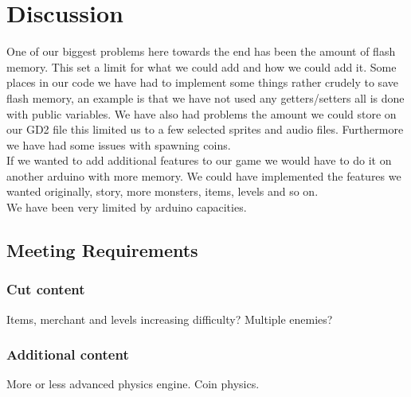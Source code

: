 \chapter{Discussion}
 
One of our biggest problems here towards the end has been the amount of flash memory. This set a limit for what we could add and how we could add it. Some places in our code we have had to implement some things rather crudely to save flash memory, an example is that we have not used any getters/setters all is done with public variables. We have also had problems the amount we could store on our GD2 file this limited us to a few selected sprites and audio files. Furthermore we have had some issues with spawning coins.\\
If we wanted to add additional features to our game we would have to do it on another arduino with more memory. We could have implemented the features we wanted originally, story, more monsters, items, levels and so on.\\
We have been very limited by arduino capacities. 


\section{Meeting Requirements}

\subsection*{Cut content}
Items, merchant and levels
increasing difficulty?
Multiple enemies?
\subsection*{Additional content}
More or less advanced physics engine.
Coin physics.
